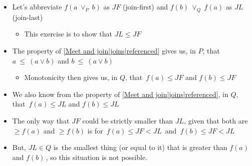 \begin{itemize}
    \item  Let's abbreviate $f(a\ \lor_P\ b)$ as $JF$ (join-first) and $f(b)\ \lor_Q\  f(a)$ as $JL$ (join-last)
          \begin{itemize}
            \item This exercise is to show that $JL \leq JF$\end{itemize}
    \item The property of \ref{Meet and join|joins|referenced} gives us, in $P$, that \,$a\ \leq\ (a \lor b)$ and $b\ \leq\ (a \lor b)$\,
          \begin{itemize}
            \item Monotonicity then gives us, in $Q$, that \,$f(a) \leq JF$ and $f(b) \leq JF$\,
          \end{itemize}
    \item We also know from the property of \ref{Meet and join|joins|referenced}, in $Q$, that \,$f(a) \leq JL$ and $f(b) \leq JL$\,
    \item The only way that $JF$ could be strictly smaller than $JL$, given that both are $\geq f(a)$ and $\geq f(b)$ is for \,$f(a) \leq JF < JL$\, and  \,$f(b) \leq JF < JL$\,
    \item But, $JL \in Q$ is \,the smallest thing (or equal to it) that is greater than $f(a)$ and $f(b)$\,, so this situation is not possible.
  \end{itemize}
